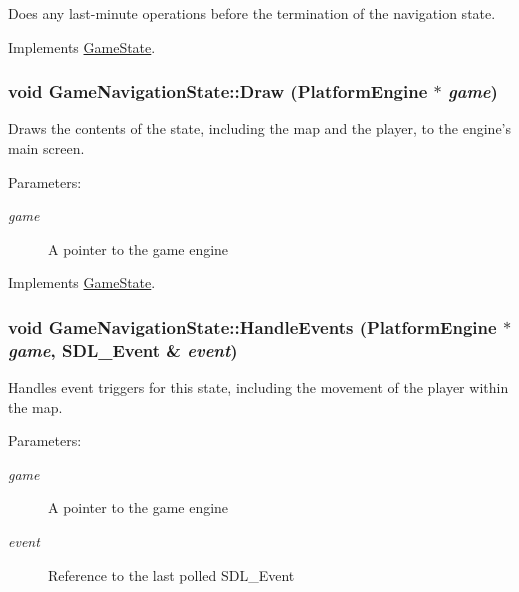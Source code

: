 Does any last-minute operations before the termination of the navigation state. 

Implements \hyperlink{class_game_state_041e7a5430d71da84745af11abdacd93}{GameState}.\hypertarget{class_game_navigation_state_a37dce070a906454c512192c067fda09}{
\subsubsection[{Draw}]{\setlength{\rightskip}{0pt plus 5cm}void GameNavigationState::Draw ({\bf PlatformEngine} $\ast$ {\em game})}}
\label{class_game_navigation_state_a37dce070a906454c512192c067fda09}


Draws the contents of the state, including the map and the player, to the engine's main screen.

\begin{Desc}
\item[Parameters:]
\begin{description}
\item[{\em game}]A pointer to the game engine \end{description}
\end{Desc}


Implements \hyperlink{class_game_state_7333dda0f49b3fa1c01cd3295f853024}{GameState}.\hypertarget{class_game_navigation_state_c47e8f7b8802e7b7e7b5076c20313596}{
\subsubsection[{HandleEvents}]{\setlength{\rightskip}{0pt plus 5cm}void GameNavigationState::HandleEvents ({\bf PlatformEngine} $\ast$ {\em game}, \/  SDL\_\-Event \& {\em event})}}
\label{class_game_navigation_state_c47e8f7b8802e7b7e7b5076c20313596}


Handles event triggers for this state, including the movement of the player within the map.

\begin{Desc}
\item[Parameters:]
\begin{description}
\item[{\em game}]A pointer to the game engine \item[{\em event}]Reference to the last polled SDL\_\-Event \end{description}
\end{Desc}


